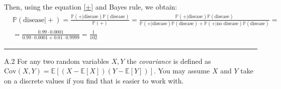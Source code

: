 \documentclass{article}
\newcommand{\1}{\mathbf{1}}
\newcommand{\E}{\mathbb{E}}
\begin{document}
Then, using the equation \eqref{+} and Bayes rule, we obtain:
\begin{equation}\boxed{
\begin{split}
    &\mathbb{P}(\text{disease} \vert +) = \frac{\mathbb{P}(+\vert \text{disease})\mathbb{P}( \text{disease})}{\mathbb{P}(+)} = \frac{\mathbb{P}(+\vert \text{disease})\mathbb{P}( \text{disease})}{\mathbb{P}(+\vert \text{disease})\mathbb{P}(\text{disease}) +  \mathbb{P}(+\vert \text{no disease})\mathbb{P}(\text{disease})} =\\
    &= \frac{0.99\cdot0.0001}{0.99\cdot0.0001 + 0.01\cdot0.9999} = \frac{1}{102}
\end{split}}
\end{equation}

\noindent\rule{\textwidth}{1pt}


A.2 For any two random variables $X,Y$ the \emph{covariance} is
  defined as
  $\text{Cov}(X,Y)=\E[(X-\E[X])(Y-\E[Y])]$. You may assume $X$ and $Y$
  take on a discrete values if you find that is easier to work with.
\end{document}
